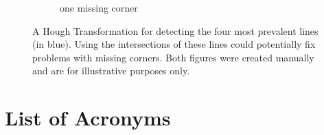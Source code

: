 \documentclass[bibliography=totoc]{scrartcl}
\begin{document}
\begin{figure}[H]
\begin{subfigure}[t]{0.4\linewidth}
		\caption{one missing corner}
	\end{subfigure}
	\caption{A Hough Transformation for detecting the four most prevalent lines (in blue). Using the intersections of these lines could potentially fix problems with missing corners. Both figures were created manually and are for illustrative purposes only.}
	\label{fig:missing_corner_hough}
\end{figure}

\clearpage
\section*{List of Acronyms}

\begin{acronym}[....]
\end{acronym}


\end{document}
